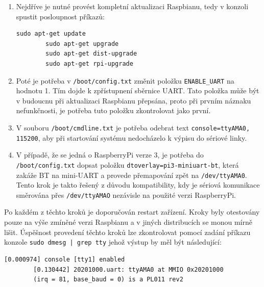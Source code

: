 \begin{enumerate}
	\item Nejdříve je nutné provést kompletní aktualizaci Raspbianu, tedy v konzoli spustit posloupnost příkazů:
	
	\begin{lstlisting}[style=MyCodeBash]
		sudo apt-get update
		sudo apt-get upgrade
		sudo apt-get dist-upgrade
		sudo apt-get rpi-upgrade	
	\end{lstlisting}
					
	\item Poté je potřeba v \texttt{/boot/config.txt} změnit položku \texttt{ENABLE\_UART} na hodnotu 1. Tím dojde k zpřístupnení sběrnice UART. Tato položka může být v budoucnu při aktualizaci Raspbianu přepsána, proto při prvním náznaku nefunkčnosti, je potřeba tuto položku zkontrolovat jako první.
	\item V souboru \texttt{/boot/cmdline.txt} je potřeba odebrat text \texttt{console=ttyAMA0, 115200}, aby při startování systému nedocházelo k výpisu do sériové linky. 
	\item V případě, že se jedná o RaspberryPi verze 3, je potřeba do \texttt{/boot/config.txt} dopsat položku \texttt{dtoverlay=pi3-miniuart-bt}, která zakáže BT na mini-UART a provede přemapování zpět na \texttt{/dev/ttyAMA0}. Tento krok je takto řešený z důvodu kompatibility, kdy je sériová komunikace směrována přes \texttt{/dev/ttyAMAO} nezávisle na použité verzi RaspberryPi.
\end{enumerate}

Po každém z těchto kroků je doporučován restart zařízení. Kroky byly otestovány pouze na výše zmíněné verzi Raspbianu a v jiných distribucích se monou mírně lišit. Úspěšnost provedení těchto kroků lze zkontrolovat pomocí zadání příkazu konzole \texttt{sudo dmesg | grep tty} jehož výstup by měl být následující:
					
	\begin{lstlisting}[style=MyCodeBash]
		[0.000974] console [tty1] enabled
		[0.130442] 20201000.uart: ttyAMA0 at MMIO 0x20201000 
		(irq = 81, base_baud = 0) is a PL011 rev2
	\end{lstlisting}
	\vspace{-20pt}




